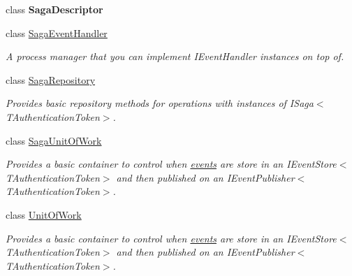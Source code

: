 \begin{DoxyCompactItemize}
class {\bfseries Saga\+Descriptor}
\item 
class \hyperlink{classCqrs_1_1Domain_1_1SagaEventHandler}{Saga\+Event\+Handler}
\begin{DoxyCompactList}\small\item\em A process manager that you can implement I\+Event\+Handler instances on top of. \end{DoxyCompactList}\item 
class \hyperlink{classCqrs_1_1Domain_1_1SagaRepository}{Saga\+Repository}
\begin{DoxyCompactList}\small\item\em Provides basic repository methods for operations with instances of I\+Saga$<$\+T\+Authentication\+Token$>$. \end{DoxyCompactList}\item 
class \hyperlink{classCqrs_1_1Domain_1_1SagaUnitOfWork}{Saga\+Unit\+Of\+Work}
\begin{DoxyCompactList}\small\item\em Provides a basic container to control when \hyperlink{}{events} are store in an I\+Event\+Store$<$\+T\+Authentication\+Token$>$ and then published on an I\+Event\+Publisher$<$\+T\+Authentication\+Token$>$. \end{DoxyCompactList}\item 
class \hyperlink{classCqrs_1_1Domain_1_1UnitOfWork}{Unit\+Of\+Work}
\begin{DoxyCompactList}\small\item\em Provides a basic container to control when \hyperlink{}{events} are store in an I\+Event\+Store$<$\+T\+Authentication\+Token$>$ and then published on an I\+Event\+Publisher$<$\+T\+Authentication\+Token$>$. \end{DoxyCompactList}\end{DoxyCompactItemize}
